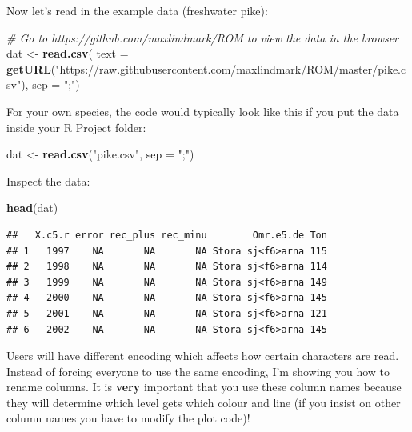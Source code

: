 \documentclass[]{article}
\newenvironment{Shaded}{\begin{snugshade}}{\end{snugshade}}
\newcommand{\KeywordTok}[1]{\textcolor[rgb]{0.13,0.29,0.53}{\textbf{#1}}}
\newcommand{\DataTypeTok}[1]{\textcolor[rgb]{0.13,0.29,0.53}{#1}}
\newcommand{\StringTok}[1]{\textcolor[rgb]{0.31,0.60,0.02}{#1}}
\newcommand{\CommentTok}[1]{\textcolor[rgb]{0.56,0.35,0.01}{\textit{#1}}}
\newcommand{\NormalTok}[1]{#1}
\begin{document}
Now let's read in the example data (freshwater pike):

\begin{Shaded}
\begin{Highlighting}[]
\CommentTok{# Go to https://github.com/maxlindmark/ROM to view the data in the browser}
\NormalTok{dat <-}\StringTok{ }\KeywordTok{read.csv}\NormalTok{(}
  \DataTypeTok{text =} \KeywordTok{getURL}\NormalTok{(}\StringTok{"https://raw.githubusercontent.com/maxlindmark/ROM/master/pike.csv"}\NormalTok{), }
  \DataTypeTok{sep =} \StringTok{";"}\NormalTok{)}
\end{Highlighting}
\end{Shaded}

For your own species, the code would typically look like this if you put
the data inside your R Project folder:

\begin{Shaded}
\begin{Highlighting}[]
\NormalTok{dat <-}\StringTok{ }\KeywordTok{read.csv}\NormalTok{(}\StringTok{"pike.csv"}\NormalTok{, }\DataTypeTok{sep =} \StringTok{";"}\NormalTok{)}
\end{Highlighting}
\end{Shaded}

Inspect the data:

\begin{Shaded}
\begin{Highlighting}[]
\KeywordTok{head}\NormalTok{(dat)}
\end{Highlighting}
\end{Shaded}

\begin{verbatim}
##   X.c5.r error rec_plus rec_minu        Omr.e5.de Ton
## 1   1997    NA       NA       NA Stora sj<f6>arna 115
## 2   1998    NA       NA       NA Stora sj<f6>arna 114
## 3   1999    NA       NA       NA Stora sj<f6>arna 149
## 4   2000    NA       NA       NA Stora sj<f6>arna 145
## 5   2001    NA       NA       NA Stora sj<f6>arna 121
## 6   2002    NA       NA       NA Stora sj<f6>arna 145
\end{verbatim}

Users will have different encoding which affects how certain characters
are read. Instead of forcing everyone to use the same encoding, I'm
showing you how to rename columns. It is \textbf{very} important that
you use these column names because they will determine which level gets
which colour and line (if you insist on other column names you have to
modify the plot code)!
\end{document}
